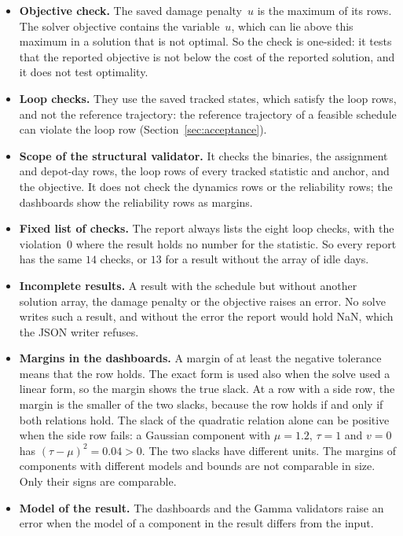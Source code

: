 \documentclass[11pt,a4paper]{article}
\theoremstyle{plain}
\theoremstyle{definition}
\theoremstyle{remark}
\begin{document}
\begin{itemize}
  \item \textbf{Objective check.} The saved damage penalty~$u$ is the maximum of its rows.
    The solver objective contains the variable~$u$, which can lie above this maximum in a solution that is not optimal.
    So the check is one-sided: it tests that the reported objective is not below the cost of the reported solution, and it does not test optimality.
  \item \textbf{Loop checks.} They use the saved tracked states, which satisfy the loop rows, and not the reference trajectory: the reference trajectory of a feasible schedule can violate the loop row (Section~\ref{sec:acceptance}).
  \item \textbf{Scope of the structural validator.} It checks the binaries, the assignment and depot-day rows, the loop rows of every tracked statistic and anchor, and the objective.
    It does not check the dynamics rows or the reliability rows; the dashboards show the reliability rows as margins.
  \item \textbf{Fixed list of checks.} The report always lists the eight loop checks, with the violation~$0$ where the result holds no number for the statistic.
    So every report has the same $14$ checks, or $13$ for a result without the array of idle days.
  \item \textbf{Incomplete results.} A result with the schedule but without another solution array, the damage penalty or the objective raises an error.
    No solve writes such a result, and without the error the report would hold NaN, which the JSON writer refuses.
  \item \textbf{Margins in the dashboards.} A margin of at least the negative tolerance means that the row holds.
    The exact form is used also when the solve used a linear form, so the margin shows the true slack.
    At a row with a side row, the margin is the smaller of the two slacks, because the row holds if and only if both relations hold.
    The slack of the quadratic relation alone can be positive when the side row fails: a Gaussian component with $\mu = 1.2$, $\tau = 1$ and $v = 0$ has $(\tau - \mu)^2 = 0.04 > 0$.
    The two slacks have different units.
    The margins of components with different models and bounds are not comparable in size.
    Only their signs are comparable.
  \item \textbf{Model of the result.} The dashboards and the Gamma validators raise an error when the model of a component in the result differs from the input.

\end{itemize}
\end{document}
